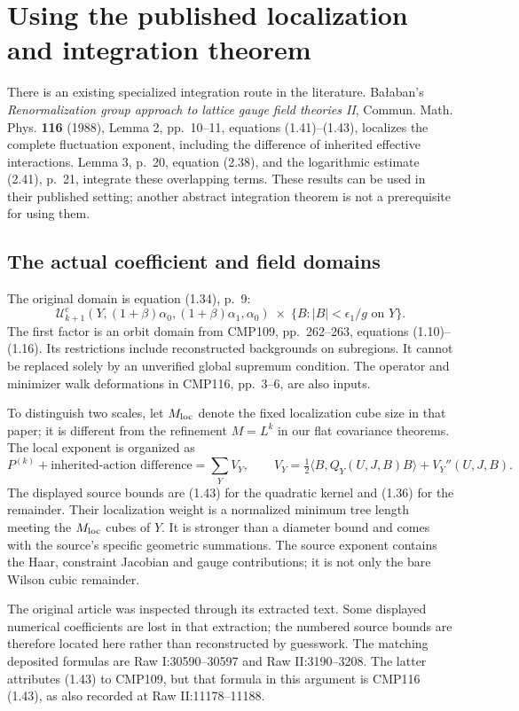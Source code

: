 \section{Using the published localization and integration theorem}
\label{ib-section}

There is an existing specialized integration route in the literature.
Ba\l aban's \emph{Renormalization group approach to lattice gauge
field theories II}, Commun. Math. Phys. \textbf{116} (1988),
Lemma 2, pp.~10--11, equations (1.41)--(1.43), localizes the
complete fluctuation exponent, including the difference of inherited
effective interactions. Lemma 3, p.~20, equation (2.38), and the
logarithmic estimate (2.41), p.~21, integrate these overlapping
terms. These results can be used in their published setting;
another abstract integration theorem is not a prerequisite for
using them.

\subsection{The actual coefficient and field domains}

The original domain is equation (1.34), p.~9:
\[
 \mathcal U^c_{k+1}
   (Y,(1+\beta)\alpha_0,(1+\beta)\alpha_1,\alpha_0)
       \;\times\;
 \{B:|B|<\epsilon_1/g\text{ on }Y\}.
\]
The first factor is an orbit domain from CMP109, pp.~262--263,
equations (1.10)--(1.16). Its restrictions include reconstructed
backgrounds on subregions. It cannot be replaced solely by an
unverified global supremum condition. The operator and minimizer
walk deformations in CMP116, pp.~3--6, are also inputs.

To distinguish two scales, let $M_{\rm loc}$ denote the fixed
localization cube size in that paper; it is different from the
refinement $M=L^k$ in our flat covariance theorems. The local
exponent is organized as
\[
 P^{(k)}+\text{inherited-action difference}=\sum_Y V_Y,
 \qquad
 V_Y=\tfrac12\langle B,Q_Y(U,J,B)B\rangle+V_Y''(U,J,B).
\]
The displayed source bounds are (1.43) for the quadratic kernel
and (1.36) for the remainder. Their localization weight is a
normalized minimum tree length meeting the $M_{\rm loc}$ cubes
of $Y$. It is stronger than a diameter bound and comes with
the source's specific geometric summations. The source exponent
contains the Haar, constraint Jacobian and gauge contributions;
it is not only the bare Wilson cubic remainder.

The original article was inspected through its extracted text.
Some displayed numerical coefficients are lost in that extraction;
the numbered source bounds are therefore located here rather than
reconstructed by guesswork. The matching deposited formulas are
Raw I:30590--30597 and Raw II:3190--3208. The latter attributes
(1.43) to CMP109, but that formula in this argument is CMP116
(1.43), as also recorded at Raw II:11178--11188.

